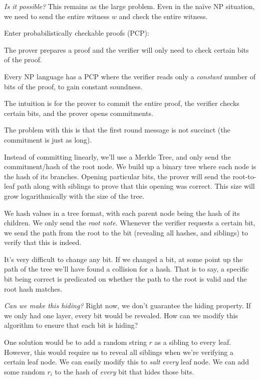 \emph{Is it possible?} This remains as the large problem. Even in the na\"ive \textsf{NP} situation, we need to send the entire witness $w$ and check the entire witness.

Enter probabilistically checkable proofs (PCP):

The prover prepares a proof and the verifier will only need to check certain bits of the proof.

\begin{theorem}
    Every \textsf{NP} language has a PCP where the verifier reads only a \emph{constant} number of bits of the proof, to gain constant soundness.
\end{theorem}

The intuition is for the prover to commit the entire proof, the verifier checks certain bits, and the prover opens commitments.


The problem with this is that the first round message is not succinct (the commitment is just as long).

Instead of committing linearly, we'll use a Merkle Tree, and only send the commitment/hash of the root node. We build up a binary tree where each node is the hash of its branches. Opening particular bits, the prover will send the root-to-leaf path along with siblings to prove that this opening was correct. This size will grow logarithmically with the size of the tree.


We hash values in a tree format, with each parent node being the hash of its children. We only send the \emph{root note}. Whenever the verifier requests a certain bit, we send the path from the root to the bit (revealing all hashes, and siblings) to verify that this is indeed.

It's very difficult to change any bit. If we changed a bit, at some point up the path of the tree we'll have found a collision for a hash. That is to say, a specific bit being correct is predicated on whether the path to the root is valid and the root hash matches.

\emph{Can we make this hiding?} Right now, we don't guarantee the hiding property. If we only had one layer, every bit would be revealed. How can we modify this algorithm to ensure that each bit is hiding?

One solution would be to add a random string $r$ as a sibling to every leaf. However, this would require us to reveal all siblings when we're verifying a certain leaf node. We can easily modify this to \emph{salt} \emph{every} leaf node. We can add some random $r_i$ to the hash of \emph{every} bit that hides those bits.

